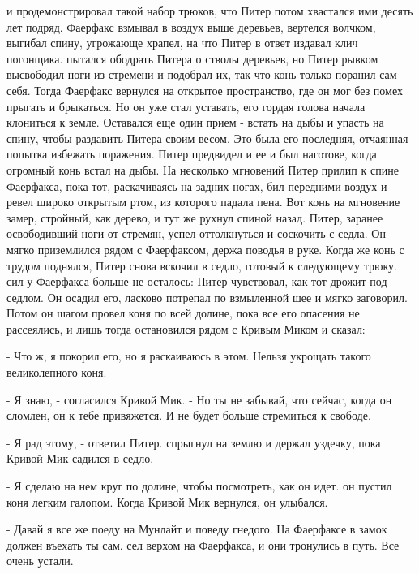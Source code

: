 и продемонстрировал такой набор трюков, что Питер потом хвастался ими 
десять лет подряд. Фаерфакс взмывал в воздух выше деревьев, вертелся 
волчком, выгибал спину, угрожающе храпел, на что Питер в ответ издавал 
клич погонщика.
 пытался ободрать Питера о стволы деревьев, но Питер 
рывком высвободил ноги из стремени и подобрал их, так что конь только 
поранил сам себя. Тогда Фаерфакс вернулся на открытое пространство, 
где он мог без помех прыгать и брыкаться. Но он уже стал уставать, его 
гордая голова начала клониться к земле. Оставался еще один прием - 
встать на дыбы и упасть на спину, чтобы раздавить Питера своим весом. 
Это была его последняя, отчаянная попытка избежать поражения.
 Питер предвидел и ее и был наготове, когда огромный конь встал 
на дыбы. На несколько мгновений Питер прилип к спине Фаерфакса, пока 
тот, раскачиваясь на задних ногах, бил передними воздух и ревел широко 
открытым ртом, из которого падала пена. Вот конь на мгновение замер, 
стройный, как дерево, и тут же рухнул спиной назад. Питер, заранее 
освободивший ноги от стремян, успел оттолкнуться и соскочить с седла. 
Он мягко приземлился рядом с Фаерфаксом, держа поводья в руке. Когда 
же конь с трудом поднялся, Питер снова вскочил в седло, готовый к 
следующему трюку.
 сил у Фаерфакса больше не осталось: Питер чувствовал, как тот 
дрожит под седлом. Он осадил его, ласково потрепал по взмыленной шее и 
мягко заговорил. Потом он шагом провел коня по всей долине, пока все 
его опасения не рассеялись, и лишь тогда остановился рядом с Кривым 
Миком и сказал:
\par- Что ж, я покорил его, но я раскаиваюсь в этом. Нельзя укрощать 
такого великолепного коня.
\par- Я знаю, - согласился Кривой Мик. - Но ты не забывай, что сейчас, 
когда он сломлен, он к тебе привяжется. И не будет больше стремиться к 
свободе.
\par- Я рад этому, - ответил Питер.
 спрыгнул на землю и держал уздечку, пока Кривой Мик садился в 
седло.
\par- Я сделаю на нем круг по долине, чтобы посмотреть, как он идет.
 он пустил коня легким галопом. Когда Кривой Мик вернулся, он 
улыбался.
\par- Давай я все же поеду на Мунлайт и поведу гнедого. На Фаерфаксе в 
замок должен въехать ты сам.
 сел верхом на Фаерфакса, и они тронулись в путь. Все очень 
устали.
